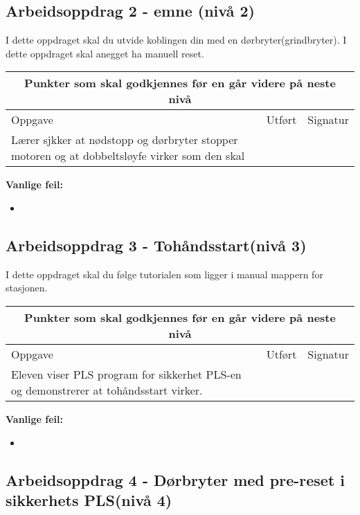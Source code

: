\subsection*{Arbeidsoppdrag 2 - emne (nivå 2)}
I dette oppdraget skal du utvide koblingen din med en dørbryter(grindbryter). I dette oppdraget skal anegget ha manuell reset. 
\begin{center}
\begin{tabular}{ | m{8cm} | m{1cm}| m{2cm} | } 
\hline
\multicolumn{3}{|c|}{Punkter som skal godkjennes før en går videre på neste nivå} \\
	\hline
	Oppgave	& Utført & Signatur \\ 
	\hline
Lærer sjkker at nødstopp og dørbryter stopper motoren og at dobbeltsløyfe virker som den skal& & \\ 
	\hline
\end{tabular}
\end{center}
\textbf{Vanlige feil:}
\begin{itemize}[noitemsep]
	\item 
\end{itemize}
\newpage
\subsection*{Arbeidsoppdrag 3 - Tohåndsstart(nivå 3)}
I dette oppdraget skal du følge tutorialen som ligger i manual mappern for stasjonen. 
\begin{center}
\begin{tabular}{ | m{8cm} | m{1cm}| m{2cm} | } 
\hline
\multicolumn{3}{|c|}{Punkter som skal godkjennes før en går videre på neste nivå} \\
	\hline
	Oppgave	& Utført & Signatur \\ 
	\hline
Eleven viser PLS program for sikkerhet PLS-en og demonstrerer at tohåndsstart virker. & & \\ 
	\hline
\end{tabular}
\end{center}
\textbf{Vanlige feil:}
\begin{itemize}[noitemsep]
	\item 
\end{itemize}
\newpage

\subsection*{Arbeidsoppdrag 4 - Dørbryter med pre-reset i sikkerhets PLS(nivå 4)}

